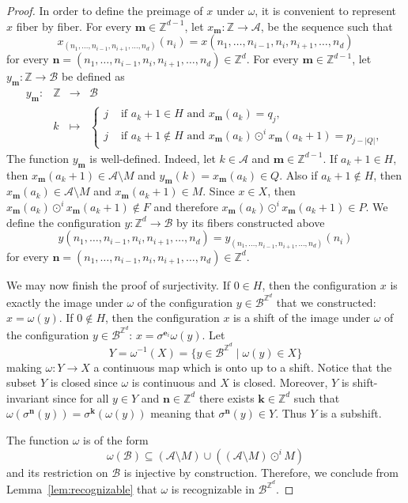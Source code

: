 \documentclass[10pt,a4paper]{amsart}
\newcommand{\Acal}{\mathcal{A}} %
\newcommand{\Bcal}{\mathcal{B}}
\newcommand{\Bm}{{\boldsymbol{m}}} %
\newcommand{\Z}{\mathbb{Z}}
\newcommand{\be}{{\boldsymbol{e}}}
\newcommand{\bk}{{\boldsymbol{k}}}
\newcommand{\bn}{{\boldsymbol{n}}}
\begin{document}
\begin{proof}
    In order to define the preimage of $x$ under $\omega$, it is convenient to
    represent $x$ fiber by fiber. For every $\Bm\in\Z^{d-1}$, let
    $x_\Bm:\Z\to\Acal$, be the sequence such that 
    \[
        x_{(n_1,\dots,n_{i-1},n_{i+1},\dots,n_d)}(n_i)
        =
        x(n_1,\dots,n_{i-1},n_i,n_{i+1},\dots,n_d)
    \]
    for every $\bn=(n_1,\dots,n_{i-1},n_i,n_{i+1},\dots,n_d)\in\Z^d$.
    For every $\Bm\in\Z^{d-1}$, let $y_\Bm:\Z\to\Bcal$ be defined as
    \begin{equation*}
    \begin{array}{rccl}
        y_\Bm:&\Z & \to & \Bcal\\
        &k & \mapsto &
    \begin{cases}
        j & \text{ if }a_k+1\in H \text{ and } x_\Bm(a_k)=q_j,\\
        j & \text{ if }a_k+1\notin H    \text{ and } x_\Bm(a_k)\odot^i x_\Bm(a_k+1)=p_{j-|Q|}, 
    \end{cases}
    \end{array}
    \end{equation*}
    The function $y_\Bm$ is well-defined.
    Indeed, let $k\in\Acal$ and $\Bm\in\Z^{d-1}$.
    If $a_k+1\in H$, then 
    $x_\Bm(a_k+1)\in\Acal\setminus M$
    and
    $y_\Bm(k)= x_\Bm(a_k)\in Q$.
    Also if $a_k+1\notin H$, then 
    $x_\Bm(a_k)\in\Acal\setminus M$
    and 
    $x_\Bm(a_k+1)\in M$.
    Since $x\in X$, then $x_\Bm(a_k)\odot^i x_\Bm(a_k+1)\notin F$
    and therefore $x_\Bm(a_k)\odot^i x_\Bm(a_k+1)\in P$.
    We define the configuration $y:\Z^d\to\Bcal$ by its fibers constructed above
    \[
        y(n_1,\dots,n_{i-1},n_i,n_{i+1},\dots,n_d)
        =
        y_{(n_1,\dots,n_{i-1},n_{i+1},\dots,n_d)}(n_i)
    \]
    for every $\bn=(n_1,\dots,n_{i-1},n_i,n_{i+1},\dots,n_d)\in\Z^d$.

    We may now finish the proof of surjectivity.
If $0\in H$, 
then the configuration $x$ is exactly the image under $\omega$ of the configuration $y\in\Bcal^{\Z^d}$ that
we constructed: $x=\omega(y)$.
If $0\notin H$, then 
the configuration $x$ is a shift of the image under $\omega$ of the
configuration $y\in\Bcal^{\Z^d}$: $x=\sigma^{\be_i}\omega(y)$.
    Let
    \[
        Y = \omega^{-1}(X) = \{y\in\Bcal^{\Z^d} \mid \omega(y)\in X\}
    \]
    making $\omega:Y\to X$ a continuous map which is onto up to a shift.
    Notice that the subset $Y$ is closed since $\omega$ is continuous and $X$ is closed.
    Moreover, $Y$ is shift-invariant since 
    for all $y\in Y$ and $\bn\in\Z^d$
    there exists $\bk\in\Z^d$ such that $\omega(\sigma^\bn(y))=\sigma^\bk(\omega(y))$
    meaning that $\sigma^\bn(y)\in Y$.
    Thus $Y$ is a subshift.

The function $\omega$ is of the form
\begin{equation*}
    \omega(\Bcal)
    \subseteq (\Acal\setminus M)
    \cup \left((\Acal\setminus M)\odot^i M\right)
\end{equation*}
and its restriction on $\Bcal$ is injective by construction.
    Therefore, we conclude from Lemma~\ref{lem:recognizable} that
    $\omega$ is recognizable in $\Bcal^{\Z^d}$.
\end{proof}
\end{document}
